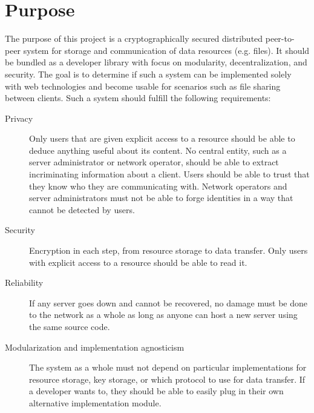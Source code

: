 \section{Purpose}\label{sec:purpose}

The purpose of this project is a cryptographically secured distributed peer-to-peer system for storage and communication of data resources (e.g. files). It should be bundled as a developer library with focus on modularity, decentralization, and security. The goal is to determine if such a system can be implemented solely with web technologies and become usable for scenarios such as file sharing between clients.
Such a system should fulfill the following requirements:

\begin{description}
  \item[Privacy] Only users that are given explicit access to a resource should be able to deduce anything useful about its content. No central entity, such as a server administrator or network operator, should be able to extract incriminating information about a client. Users should be able to trust that they know who they are communicating with. Network operators and server administrators must not be able to forge identities in a way that cannot be detected by users.

\item[Security] Encryption in each step, from resource storage to data transfer. Only users with explicit access to a resource should be able to read it.

\item[Reliability] If any server goes down and cannot be recovered, no damage must be done to the network as a whole as long as anyone can host a new server using the same source code.

\item[Modularization and implementation agnosticism] The system as a whole must not depend on particular implementations for resource storage, key storage, or which protocol to use for data transfer. If a developer wants to, they should be able to easily plug in their own alternative implementation module.

\end{description}
